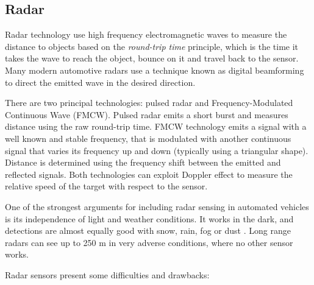 \subsection{Radar}

Radar technology use high frequency electromagnetic waves to measure the
distance to objects based on the \emph{round-trip time} principle, which is the
time it takes the wave to reach the object, bounce on it and travel back to the
sensor. 
Many modern automotive radars use a technique known as digital beamforming
\cite{Hasch2015} to direct the emitted wave in the desired direction.
 
There are two principal technologies: pulsed radar and Frequency-Modulated
Continuous Wave (FMCW). Pulsed radar emits a short burst and measures distance
using the raw round-trip time. FMCW technology emits a signal with a well known
and stable frequency, that is modulated with another continuous signal that
varies its frequency up and down (typically using a triangular shape).
Distance is determined using the frequency shift between the emitted and 
reflected signals. 
Both technologies can exploit Doppler effect to measure the relative speed of 
the target with respect to the sensor. 


One of the strongest arguments for including radar sensing in automated 
vehicles is its independence of light and weather conditions. 
It works in the dark, and detections are almost equally good with snow, 
rain, fog or dust \cite{Reina2015}. Long range radars can see up to 250 m
in very adverse conditions, where no other sensor works.

Radar sensors present some difficulties and drawbacks:

